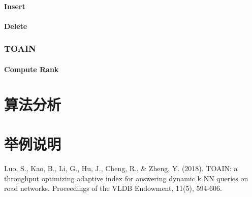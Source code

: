 \documentclass{ML}
\begin{document}
\paragraph{Insert}
\paragraph{Delete}
\subsubsection{TOAIN}
\paragraph{Compute Rank}
\section{算法分析}

\section{举例说明}

\appendix

\begin{thebibliography}{20}
     Luo, S., Kao, B., Li, G., Hu, J., Cheng, R., \& Zheng, Y. (2018). TOAIN: a throughput optimizing adaptive index for answering dynamic k NN queries on road networks. Proceedings of the VLDB Endowment, 11(5), 594-606.
\end{thebibliography}
\end{document}
